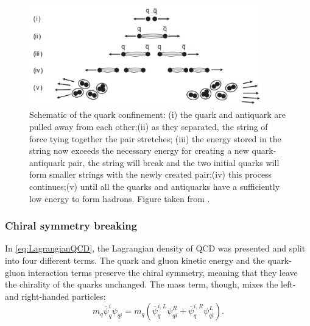\begin{figure}[t]
\begin{center}
\includegraphics[width=0.9\textwidth]{Figs/Chapter2/Screenshot_20230220_214232.eps}
\end{center}
\caption{Schematic of the quark confinement: (i) the quark and antiquark are pulled away from each other;(ii) as they separated, the string of force tying together the pair stretches; (iii) the energy stored in the string now exceeds the necessary energy for creating a new quark-antiquark pair, the string will break and the two initial quarks will form smaller strings with the newly created pair;(iv) this process continues;(v) until all the quarks and antiquarks have a sufficiently low energy to form hadrons. Figure taken from \cite{thomsonModernParticlePhysics2013}.}
\label{fig:QuarkFragmentation}
\end{figure}


\subsubsection{Chiral symmetry breaking}
\label{subsubsec:chiralsymmetrybreaking}

In \eq\ref{eq:LagrangianQCD}, the Lagrangian density of QCD was presented and split into four different terms. The quark and gluon kinetic energy and the quark-gluon interaction terms preserve the chiral symmetry, meaning that they leave the chirality of the quarks unchanged. The mass term, though, mixes the left- and right-handed particles:
\begin{equation}
m_{q} \bar{\psi}_{q}^{i} \psi_{qi} = m_{q} \left( \bar{\psi}_{q}^{i, L} \psi_{qi}^{R} + \bar{\psi}_{q}^{i, R} \psi_{qi}^{L} \right).
\label{eq:LagrangianQCDMassTerm}
\end{equation}

